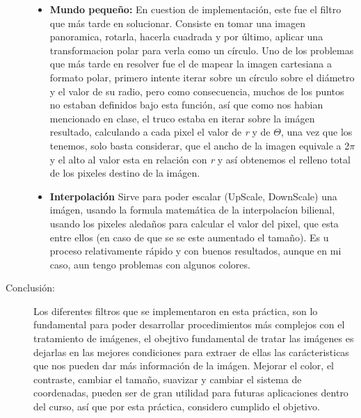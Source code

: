 \documentclass[12pt]{article}
\begin{document}
\begin{description}
\begin{itemize}
     \item \textbf{Mundo pequeño: } En cuestion de implementaci\'on, este fue el filtro que m\'as tarde en
     solucionar. Consiste en tomar una imagen panoramica, rotarla, hacerla cuadrada y por \'ultimo, aplicar
     una transformacion polar para verla como un c\'irculo. Uno de los problemas que m\'as tarde en resolver 
     fue el de mapear la imagen cartesiana a formato polar, primero intente iterar sobre un c\'irculo sobre 
     el di\'ametro y el valor de su radio, pero como consecuencia, muchos de los puntos no estaban definidos
     bajo esta funci\'on, as\'i que como nos habian mencionado en clase, el truco estaba en iterar sobre la 
     im\'agen resultado, calculando a cada pixel el valor de \textit{r} y de \textit{$\Theta$}, una vez que los
     tenemos, solo basta considerar, que el ancho de la imagen equivale a 2$\pi$ y el alto al valor esta en 
     relaci\'on con \textit{r} y as\'i obtenemos el relleno total de los pixeles destino de la im\'agen.
     
     \item \textbf{Interpolaci\'on} Sirve para poder escalar (UpScale, DownScale) una im\'agen, usando
     la formula matem\'atica de la interpolac\'ion bilienal, usando los pixeles aledaños para calcular
     el valor del pixel, que esta entre ellos (en caso de que se se este aumentado el tamaño). Es u proceso
     relativamente r\'apido y con buenos resultados, aunque en mi caso, aun tengo problemas con algunos colores.
     
      
   \end{itemize} 
   
   \item[Conclusi\'on:]
   Los diferentes filtros que se implementaron en esta pr\'actica, son lo fundamental para poder 
   desarrollar procedimientos m\'as complejos con el tratamiento de im\'agenes, el obejtivo fundamental
   de tratar las im\'agenes es dejarlas en las mejores condiciones para extraer de ellas las car\'acteristicas
   que nos pueden dar m\'as informaci\'on de la im\'agen. Mejorar el color, el contraste, cambiar el 
   tamaño, suavizar y cambiar el sistema de coordenadas, pueden ser de gran utilidad para futuras aplicaciones
   dentro del curso, as\'i que por esta pr\'actica, considero cumplido el objetivo.
  
\end{description}
\end{document}
